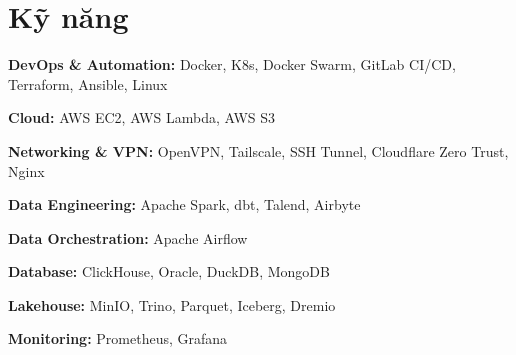 




    

\section{Kỹ năng}

\begin{onecolentry}
    \textbf{DevOps \& Automation:} Docker, K8s, Docker Swarm, GitLab CI/CD, Terraform, Ansible, Linux
\end{onecolentry}
\vspace{0.2 cm}

\begin{onecolentry}
    \textbf{Cloud:} AWS EC2, AWS Lambda, AWS S3
\end{onecolentry}
\vspace{0.2 cm}

\begin{onecolentry}
    \textbf{Networking \& VPN:} OpenVPN, Tailscale, SSH Tunnel, Cloudflare Zero Trust, Nginx
\end{onecolentry}
\vspace{0.2 cm}

\begin{onecolentry}
    \textbf{Data Engineering:} Apache Spark, dbt, Talend, Airbyte
\end{onecolentry}
\vspace{0.2 cm}

\begin{onecolentry}
    \textbf{Data Orchestration:} Apache Airflow
\end{onecolentry}
\vspace{0.2 cm}

\begin{onecolentry}
    \textbf{Database:} ClickHouse, Oracle, DuckDB, MongoDB
\end{onecolentry}
\vspace{0.2 cm}

\begin{onecolentry}
    \textbf{Lakehouse:} MinIO, Trino, Parquet, Iceberg, Dremio
\end{onecolentry}
\vspace{0.2 cm}

\begin{onecolentry}
    \textbf{Monitoring:} Prometheus, Grafana
\end{onecolentry}
\vspace{0.2 cm}

